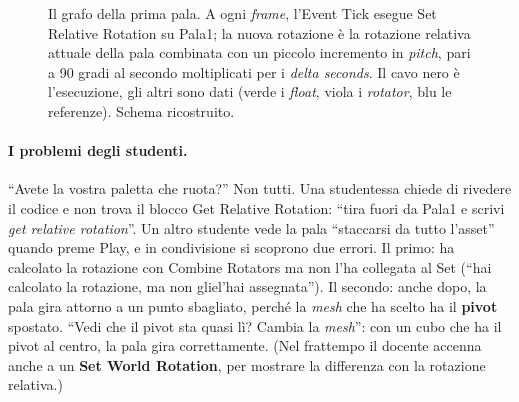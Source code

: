 \begin{figure}[htbp]
\caption{Il grafo della prima pala. A ogni \emph{frame}, l'Event Tick esegue Set
Relative Rotation su Pala1; la nuova rotazione è la rotazione relativa attuale della
pala combinata con un piccolo incremento in \emph{pitch}, pari a 90 gradi al secondo
moltiplicati per i \emph{delta seconds}. Il cavo nero è l'esecuzione, gli altri sono
dati (verde i \emph{float}, viola i \emph{rotator}, blu le referenze). Schema
ricostruito.}
\label{ue4:fig:pala}
\end{figure}

\paragraph{I problemi degli studenti.} ``Avete la vostra paletta che ruota?'' Non
tutti. Una studentessa chiede di rivedere il codice e non trova il blocco Get Relative
Rotation: ``tira fuori da Pala1 e scrivi \emph{get relative rotation}''. Un altro
studente vede la pala ``staccarsi da tutto l'asset'' quando preme Play, e in
condivisione si scoprono due errori. Il primo: ha calcolato la rotazione con Combine
Rotators ma non l'ha collegata al Set (``hai calcolato la rotazione, ma non
gliel'hai assegnata''). Il secondo: anche dopo, la pala gira attorno a un punto
sbagliato, perché la \emph{mesh} che ha scelto ha il \textbf{pivot} spostato. ``Vedi che
il pivot sta quasi lì? Cambia la \emph{mesh}'': con un cubo che ha il pivot al centro, la
pala gira correttamente. (Nel frattempo il docente accenna anche a un \textbf{Set World
Rotation}, per mostrare la differenza con la rotazione relativa.)

